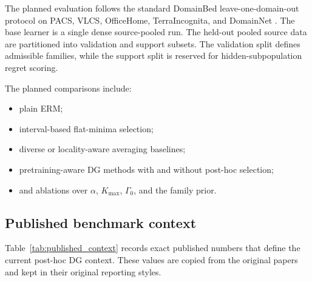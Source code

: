 \documentclass{article}
\newcommand{\erm}{\textup{\textsc{ERM}}}
\newcommand{\1}{\mathbbm{1}}
\begin{document}
The planned evaluation follows the standard DomainBed leave-one-domain-out protocol on PACS, VLCS, OfficeHome, TerraIncognita, and DomainNet \citep{gulrajani2021domainbed}. The base learner is a single dense source-pooled run. The held-out pooled source data are partitioned into validation and support subsets. The validation split defines admissible families, while the support split is reserved for hidden-subpopulation regret scoring.

The planned comparisons include:
\begin{itemize}[leftmargin=1.4em]
    \item plain \erm{};
    \item interval-based flat-minima selection;
    \item diverse or locality-aware averaging baselines;
    \item pretraining-aware DG methods with and without post-hoc selection;
    \item and ablations over \(\alpha\), \(K_{\max}\), \(\Gamma_0\), and the family prior.
\end{itemize}

\subsection{Published benchmark context}

Table~\ref{tab:published_context} records exact published numbers that define the current post-hoc DG context. These values are copied from the original papers and kept in their original reporting styles.
\end{document}
